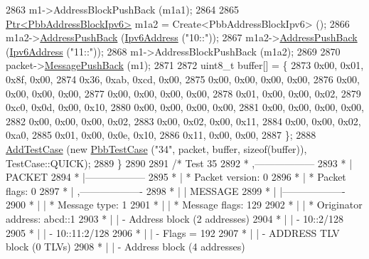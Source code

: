 \begin{DoxyCode}
2863     m1->AddressBlockPushBack (m1a1);
2864 
2865     \hyperlink{classns3_1_1Ptr}{Ptr<PbbAddressBlockIpv6>} m1a2 = Create<PbbAddressBlockIpv6> ();
2866     m1a2->\hyperlink{classns3_1_1PbbAddressBlock_a7be545a53d69bd426dbebcf752ed8371}{AddressPushBack} (\hyperlink{classns3_1_1Ipv6Address}{Ipv6Address} (\textcolor{stringliteral}{"10::"}));
2867     m1a2->\hyperlink{classns3_1_1PbbAddressBlock_a7be545a53d69bd426dbebcf752ed8371}{AddressPushBack} (\hyperlink{classns3_1_1Ipv6Address}{Ipv6Address} (\textcolor{stringliteral}{"11::"}));
2868     m1->AddressBlockPushBack (m1a2);
2869 
2870     packet->\hyperlink{classns3_1_1PbbPacket_a4a3170001ef758d9c9c4375b8f089826}{MessagePushBack} (m1);
2871 
2872     uint8\_t buffer[] = \{
2873       0x00, 0x01, 0x8f, 0x00,
2874       0x36, 0xab, 0xcd, 0x00,
2875       0x00, 0x00, 0x00, 0x00,
2876       0x00, 0x00, 0x00, 0x00,
2877       0x00, 0x00, 0x00, 0x00,
2878       0x01, 0x00, 0x00, 0x02,
2879       0xc0, 0x0d, 0x00, 0x10,
2880       0x00, 0x00, 0x00, 0x00,
2881       0x00, 0x00, 0x00, 0x00,
2882       0x00, 0x00, 0x00, 0x02,
2883       0x00, 0x02, 0x00, 0x11,
2884       0x00, 0x00, 0x02, 0xa0,
2885       0x01, 0x00, 0x0e, 0x10,
2886       0x11, 0x00, 0x00,
2887     \};
2888     \hyperlink{classns3_1_1TestCase_a3718088e3eefd5d6454569d2e0ddd835}{AddTestCase} (\textcolor{keyword}{new} \hyperlink{classPbbTestCase}{PbbTestCase} (\textcolor{stringliteral}{"34"}, packet, buffer, \textcolor{keyword}{sizeof}(buffer)), 
      TestCase::QUICK);
2889   \}
2890 
2891   \textcolor{comment}{/* Test 35}
2892 \textcolor{comment}{         * ,------------------}
2893 \textcolor{comment}{         * |  PACKET}
2894 \textcolor{comment}{         * |------------------}
2895 \textcolor{comment}{         * | * Packet version:    0}
2896 \textcolor{comment}{         * | * Packet flags:  0}
2897 \textcolor{comment}{         * |    ,-------------------}
2898 \textcolor{comment}{         * |    |  MESSAGE}
2899 \textcolor{comment}{         * |    |-------------------}
2900 \textcolor{comment}{         * |    | * Message type:       1}
2901 \textcolor{comment}{         * |    | * Message flags:  129}
2902 \textcolor{comment}{         * |    | * Originator address: abcd::1}
2903 \textcolor{comment}{         * |    | - Address block (2 addresses)}
2904 \textcolor{comment}{         * |    |     - 10::2/128}
2905 \textcolor{comment}{         * |    |     - 10::11:2/128}
2906 \textcolor{comment}{         * |    |     - Flags = 192}
2907 \textcolor{comment}{         * |    | - ADDRESS TLV block (0 TLVs)}
2908 \textcolor{comment}{         * |    | - Address block (4 addresses)}

\end{DoxyCode}
